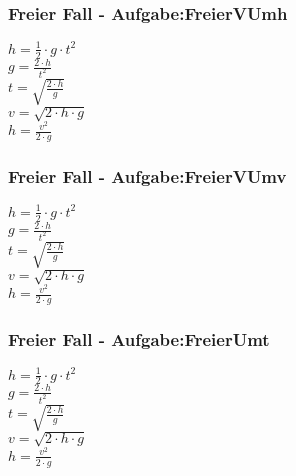 \subsubsection{Freier Fall - Aufgabe:FreierVUmh} 
\begin{minipage}{0.45\textwidth} 
$ h = \frac{1}{2}\cdot g\cdot t^{2} $\\ 
$ g = \frac{2\cdot h}{ t^{2} } $\\ 
$ t = \sqrt{\frac{2\cdot h}{g}} $\\ 
$ v = \sqrt{2\cdot h\cdot g} $\\ 
$ h = \frac{ v^{2} }{2\cdot g} $\\ 
\end{minipage} 
\begin{minipage}{0.45\textwidth} 
 
\end{minipage} 
\subsubsection{Freier Fall - Aufgabe:FreierVUmv} 
\begin{minipage}{0.45\textwidth} 
$ h = \frac{1}{2}\cdot g\cdot t^{2} $\\ 
$ g = \frac{2\cdot h}{ t^{2} } $\\ 
$ t = \sqrt{\frac{2\cdot h}{g}} $\\ 
$ v = \sqrt{2\cdot h\cdot g} $\\ 
$ h = \frac{ v^{2} }{2\cdot g} $\\ 
\end{minipage} 
\begin{minipage}{0.45\textwidth} 
 
\end{minipage} 
\subsubsection{Freier Fall - Aufgabe:FreierUmt} 
\begin{minipage}{0.45\textwidth} 
$ h = \frac{1}{2}\cdot g\cdot t^{2} $\\ 
$ g = \frac{2\cdot h}{ t^{2} } $\\ 
$ t = \sqrt{\frac{2\cdot h}{g}} $\\ 
$ v = \sqrt{2\cdot h\cdot g} $\\ 
$ h = \frac{ v^{2} }{2\cdot g} $\\ 
\end{minipage} 
\begin{minipage}{0.45\textwidth} 
 
\end{minipage} 
